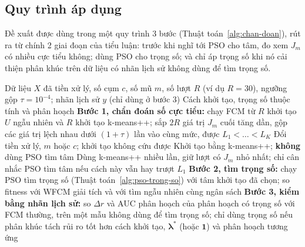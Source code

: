 \subsection{Quy trình áp dụng}
\label{sec:quy-trinh}

Đề xuất được dùng trong một quy trình 3 bước (Thuật toán~\ref{alg:chan-doan}), rút ra từ chính 2 giai đoạn của tiểu luận:
trước khi nghĩ tới PSO cho tâm, đo xem $J_m$ có nhiều cực tiểu không; dùng PSO cho trọng số; và chỉ áp trọng số khi nó cải
thiện phân khúc trên dữ liệu có nhãn lịch sử không dùng để tìm trọng số.

\begin{algorithm}[htbp]
\caption{Quy trình áp dụng đề xuất khi phân cụm khách hàng bằng FCM}
\label{alg:chan-doan}
\begin{algorithmic}[1]
\REQUIRE Dữ liệu $X$ đã tiền xử lý, số cụm $c$, số mũ $m$, số lượt $R$ (ví dụ $R = 30$), ngưỡng gộp $\tau = 10^{-4}$; nhãn
  lịch sử $y$ (chỉ dùng ở bước 3)
\ENSURE Cách khởi tạo, trọng số thuộc tính và phân hoạch
\STATE \textbf{Bước 1, chẩn đoán số cực tiểu:} chạy FCM từ $R$ khởi tạo $U$ ngẫu nhiên và $R$ khởi tạo k-means++; sắp $2R$
  giá trị $J_m$ cuối tăng dần, gộp các giá trị lệch nhau dưới $(1 + \tau)$ lần vào cùng mức, được $L_1 < \dots < L_K$
  \STATE Đổi tiền xử lý, $m$ hoặc $c$; khởi tạo không cứu được
  \STATE Khởi tạo bằng k-means++; \textbf{không} dùng PSO tìm tâm
\ELSE
  \STATE Dùng k-means++ nhiều lần, giữ lượt có $J_m$ nhỏ nhất; chỉ cân nhắc PSO tìm tâm nếu cách này vẫn hay trượt $L_1$
\ENDIF
\STATE \textbf{Bước 2, tìm trọng số:} chạy PSO tìm trọng số (Thuật toán~\ref{alg:pso-trong-so}) với tâm khởi tạo đã chọn;
  so fitness với WFCM giải tích và với tìm ngẫu nhiên cùng ngân sách
\STATE \textbf{Bước 3, kiểm bằng nhãn lịch sử:} so $\Delta r$ và AUC phân hoạch của phân hoạch có trọng số với FCM thường,
  trên một mẫu không dùng để tìm trọng số; chỉ dùng trọng số nếu phân khúc tách rủi ro tốt hơn
\RETURN cách khởi tạo, $\symbf{\lambda}^{*}$ (hoặc $\mathbf{1}$) và phân hoạch tương ứng
\end{algorithmic}
\end{algorithm}


